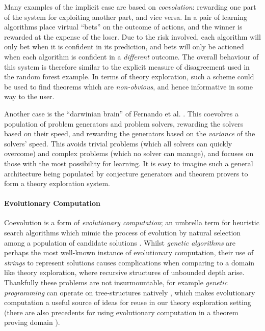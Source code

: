Many examples of the implicit case are based on \emph{coevolution}: rewarding one part of the system for exploiting another part, and vice versa. In \citep{Schmidhuber1999} a pair of learning algorithms place virtual ``bets'' on the outcome of actions, and the winner is rewarded at the expense of the loser. Due to the risk involved, each algorithm will only bet when it is confident in its prediction, and bets will only be actioned when each algorithm is confident in a \emph{different} outcome. The overall behaviour of this system is therefore similar to the explicit measure of disagreement used in the random forest example. In terms of theory exploration, such a scheme could be used to find theorems which are \emph{non-obvious}, and hence informative in some way to the user.

Another case is the ``darwinian brain'' of Fernando et al. \citep{fernando2013design1, fernando2013design2}. This coevolves a population of problem generators and problem solvers, rewarding the solvers based on their speed, and rewarding the generators based on the \emph{variance} of the solvers' speed. This avoids trivial problems (which all solvers can quickly overcome) and complex problems (which no solver can manage), and focuses on those with the most possibility for learning. It is easy to imagine such a general architecture being populated by conjecture generators and theorem provers to form a theory exploration system.

\paragraph{Evolutionary Computation} \leavevmode \newline

Coevolution is a form of \emph{evolutionary computation}; an umbrella term for heuristic search algorithms which mimic the process of evolution by natural selection among a population of candidate solutions \citep{back1997evolutionary}. Whilst \emph{genetic algorithms} are perhaps the most well-known instance of evolutionary computation, their use of \emph{strings} to represent solutions causes complications when comparing to a domain like theory exploration, where recursive structures of unbounded depth arise. Thankfully these problems are not insurmountable, for example \emph{genetic programming} can operate on tree-structures natively \citep{banzhaf1998genetic}, which makes evolutionary computation a useful source of ideas for reuse in our theory exploration setting (there are also precedents for using evolutionary computation in a theorem proving domain \citep{spector2008genetic}).

